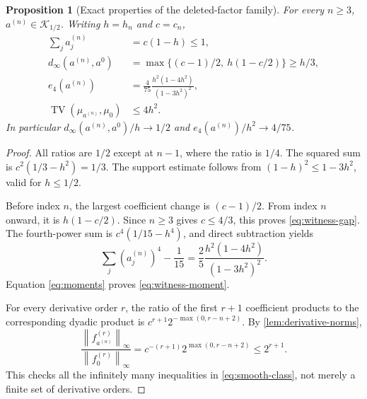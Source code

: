 \documentclass[11pt,a4paper]{article}
\numberwithin{equation}{section}
\newtheorem{proposition}[theorem]{Proposition}
\theoremstyle{definition}
\theoremstyle{remark}
\DeclareMathOperator{\TV}{TV}
\newcommand{\K}{\mathcal K}
\newcommand{\norm}[1]{\left\lVert #1\right\rVert}
\begin{document}
\begin{proposition}[Exact properties of the deleted-factor family]
\label{prop:deleted}
For every $n\ge3$, $a^{(n)}\in\K_{1/2}$. Writing $h=h_n$ and $c=c_n$,
\begin{align}
 \sum_j a_j^{(n)}&=c(1-h)\le1, \label{eq:witness-support}\\
 d_\infty(a^{(n)},a^0)
 &=\max\{(c-1)/2,\ h(1-c/2)\}\ge h/3, \label{eq:witness-gap}\\
 e_4(a^{(n)})
 &=\frac4{75}\frac{h^2(1-4h^2)}{(1-3h^2)^2}, \label{eq:witness-moment}\\
 \TV(\mu_{a^{(n)}},\mu_0)&\le4h^2. \label{eq:witness-tv}
\end{align}
In particular $d_\infty(a^{(n)},a^0)/h\to1/2$ and
$e_4(a^{(n)})/h^2\to4/75$.
\end{proposition}
\begin{proof}
All ratios are $1/2$ except at $n-1$, where the ratio is $1/4$.
The squared sum is $c^2(1/3-h^2)=1/3$. The support estimate follows from
$(1-h)^2\le1-3h^2$, valid for $h\le1/2$.

Before index $n$, the largest coefficient change is $(c-1)/2$.
From index $n$ onward, it is $h(1-c/2)$. Since $n\ge3$ gives
$c\le4/3$, this proves \eqref{eq:witness-gap}. The fourth-power sum is
$c^4(1/15-h^4)$, and direct subtraction yields
\[
 \sum_j(a_j^{(n)})^4-\frac1{15}
 =\frac25\frac{h^2(1-4h^2)}{(1-3h^2)^2}.
\]
Equation \eqref{eq:moments} proves \eqref{eq:witness-moment}.

For every derivative order $r$, the ratio of the first $r+1$ coefficient
products to the corresponding dyadic product is
$c^{r+1}2^{-\max(0,r-n+2)}$. By \cref{lem:derivative-norms},
\begin{equation}
 \frac{\norm{f_{a^{(n)}}^{(r)}}_\infty}{\norm{f_0^{(r)}}_\infty}
 =c^{-(r+1)}2^{\max(0,r-n+2)}\le2^{r+1}.
 \label{eq:witness-derivatives}
\end{equation}
This checks all the infinitely many inequalities in \eqref{eq:smooth-class},
not merely a finite set of derivative orders.


\end{proof}
\end{document}
